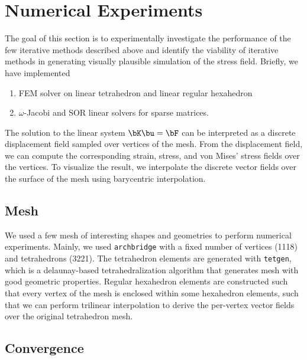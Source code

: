 \documentclass[11pt,titlepage]{article}
\begin{document}
\section{Numerical Experiments}

The goal of this section is to experimentally investigate the performance of the few iterative methods described above and identify the viability of iterative methods in generating visually plausible simulation of the stress field. Briefly, we have implemented 
\begin{enumerate}
    \item FEM solver on linear tetrahedron and linear regular hexahedron
    \item $\omega$-Jacobi and SOR linear solvers for sparse matrices. 
\end{enumerate}
The solution to the linear system $\bK \bu = \bF$ can be interpreted as a discrete displacement field sampled over vertices of the mesh. From the displacement field, we can compute the corresponding strain, stress, and von Mises' stress fields over the vertices. To visualize the result, we interpolate the discrete vector fields over the surface of the mesh using barycentric interpolation.

\subsection{Mesh}

We used a few mesh of interesting shapes and geometries to perform numerical experiments. Mainly, we used \texttt{archbridge} with a fixed number of vertices (1118) and tetrahedrons (3221). The tetrahedron elements are generated with \texttt{tetgen}, which is a delaunay-based tetrahedralization algorithm that generates mesh with good geometric properties. Regular hexahedron elements are constructed such that every vertex of the mesh is enclosed within some hexahedron elements, such that we can perform trilinear interpolation to derive the per-vertex vector fields over the original tetrahedron mesh.

\subsection{Convergence}
\end{document}
